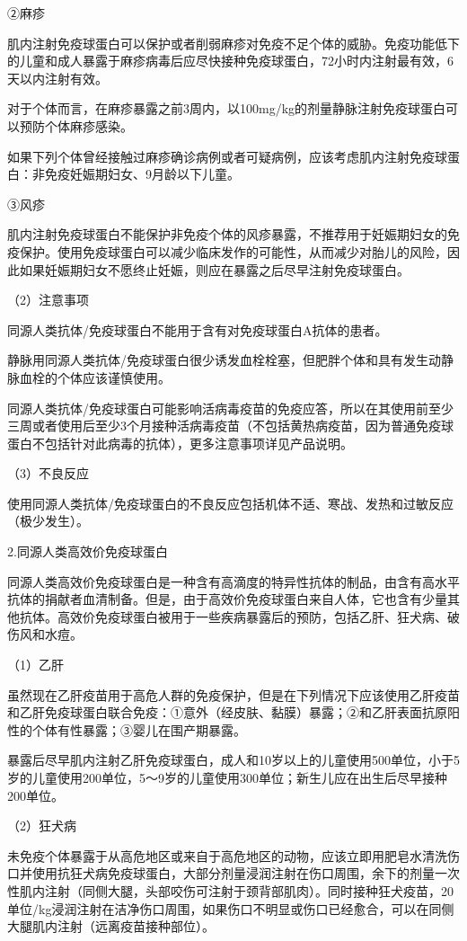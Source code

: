 ②麻疹

肌内注射免疫球蛋白可以保护或者削弱麻疹对免疫不足个体的威胁。免疫功能低下的儿童和成人暴露于麻疹病毒后应尽快接种免疫球蛋白，72小时内注射最有效，6天以内注射有效。

对于个体而言，在麻疹暴露之前3周内，以100mg/kg的剂量静脉注射免疫球蛋白可以预防个体麻疹感染。

如果下列个体曾经接触过麻疹确诊病例或者可疑病例，应该考虑肌内注射免疫球蛋白：非免疫妊娠期妇女、9月龄以下儿童。

③风疹

肌内注射免疫球蛋白不能保护非免疫个体的风疹暴露，不推荐用于妊娠期妇女的免疫保护。使用免疫球蛋白可以减少临床发作的可能性，从而减少对胎儿的风险，因此如果妊娠期妇女不愿终止妊娠，则应在暴露之后尽早注射免疫球蛋白。

（2）注意事项

同源人类抗体/免疫球蛋白不能用于含有对免疫球蛋白A抗体的患者。

静脉用同源人类抗体/免疫球蛋白很少诱发血栓栓塞，但肥胖个体和具有发生动静脉血栓的个体应该谨慎使用。

同源人类抗体/免疫球蛋白可能影响活病毒疫苗的免疫应答，所以在其使用前至少三周或者使用后至少3个月接种活病毒疫苗（不包括黄热病疫苗，因为普通免疫球蛋白不包括针对此病毒的抗体），更多注意事项详见产品说明。

（3）不良反应

使用同源人类抗体/免疫球蛋白的不良反应包括机体不适、寒战、发热和过敏反应（极少发生）。

2.同源人类高效价免疫球蛋白

同源人类高效价免疫球蛋白是一种含有高滴度的特异性抗体的制品，由含有高水平抗体的捐献者血清制备。但是，由于高效价免疫球蛋白来自人体，它也含有少量其他抗体。高效价免疫球蛋白被用于一些疾病暴露后的预防，包括乙肝、狂犬病、破伤风和水痘。

（1）乙肝

虽然现在乙肝疫苗用于高危人群的免疫保护，但是在下列情况下应该使用乙肝疫苗和乙肝免疫球蛋白联合免疫：①意外（经皮肤、黏膜）暴露；②和乙肝表面抗原阳性的个体有性暴露；③婴儿在围产期暴露。

暴露后尽早肌内注射乙肝免疫球蛋白，成人和10岁以上的儿童使用500单位，小于5岁的儿童使用200单位，5～9岁的儿童使用300单位；新生儿应在出生后尽早接种200单位。

（2）狂犬病

未免疫个体暴露于从高危地区或来自于高危地区的动物，应该立即用肥皂水清洗伤口并使用抗狂犬病免疫球蛋白，大部分剂量浸润注射在伤口周围，余下的剂量一次性肌内注射（同侧大腿，头部咬伤可注射于颈背部肌肉）。同时接种狂犬疫苗，20单位/kg浸润注射在洁净伤口周围，如果伤口不明显或伤口已经愈合，可以在同侧大腿肌内注射（远离疫苗接种部位）。

